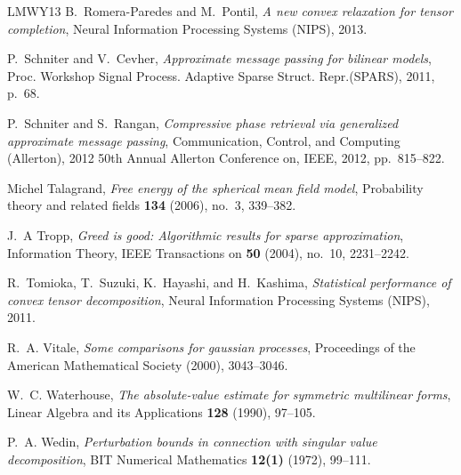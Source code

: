 \documentclass[11pt]{article}
\theoremstyle{definition}
\begin{document}
\begin{thebibliography}{LMWY13}
B.~Romera-Paredes and M.~Pontil, \emph{A new convex relaxation for tensor
  completion}, Neural Information Processing Systems (NIPS), 2013.

P.~Schniter and V.~Cevher, \emph{Approximate message passing for bilinear
  models}, Proc. Workshop Signal Process. Adaptive Sparse Struct. Repr.(SPARS),
  2011, p.~68.

P.~Schniter and S.~Rangan, \emph{Compressive phase retrieval via generalized
  approximate message passing}, Communication, Control, and Computing
  (Allerton), 2012 50th Annual Allerton Conference on, IEEE, 2012,
  pp.~815--822.

Michel Talagrand, \emph{Free energy of the spherical mean field model},
  Probability theory and related fields \textbf{134} (2006), no.~3, 339--382.

J.~A Tropp, \emph{Greed is good: Algorithmic results for sparse approximation},
  Information Theory, IEEE Transactions on \textbf{50} (2004), no.~10,
  2231--2242.

R.~Tomioka, T.~Suzuki, K.~Hayashi, and H.~Kashima, \emph{Statistical
  performance of convex tensor decomposition}, Neural Information Processing
  Systems (NIPS), 2011.

R.~A. Vitale, \emph{Some comparisons for gaussian processes}, Proceedings of
  the American Mathematical Society (2000), 3043--3046.

W.~C. Waterhouse, \emph{The absolute-value estimate for symmetric multilinear
  forms}, Linear Algebra and its Applications \textbf{128} (1990), 97--105.

P.~A. Wedin, \emph{Perturbation bounds in connection with singular value
  decomposition}, BIT Numerical Mathematics \textbf{12(1)} (1972), 99--111.

\end{thebibliography}
\end{document}
